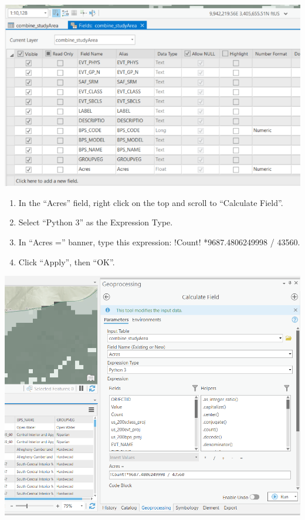 \documentclass[
]{book}
\providecommand{\tightlist}{%
  \setlength{\itemsep}{0pt}\setlength{\parskip}{0pt}}
\begin{document}
\includegraphics[width=1000pt]{04_gis_screenshots/15_fields_view}

\begin{enumerate}
\def\labelenumi{\arabic{enumi}.}
\setcounter{enumi}{2}
\tightlist
\item
  In the ``Acres'' field, right click on the top and scroll to ``Calculate Field''.
\item
  Select ``Python 3'' as the Expression Type.
\item
  In ``Acres ='' banner, type this expression: !Count! *9687.4806249998 / 43560.
\item
  Click ``Apply'', then ``OK''.
\end{enumerate}

\includegraphics[width=1000pt]{04_gis_screenshots/16_calculate_acres}
\end{document}
